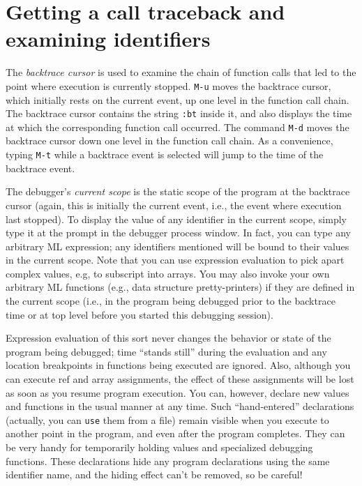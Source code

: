 \section{Getting a call traceback and examining identifiers}

The {\em backtrace cursor} is used to examine the chain of function
calls that led to the point where execution is currently stopped.
\verb'M-u' moves the backtrace cursor, which initially rests on the current
event, up one level in the function call chain.  The
backtrace cursor contains the string \verb':bt' inside it, and also
displays the time at which the corresponding function call occurred.
The command \verb'M-d' moves the backtrace cursor down one level in
the function call chain.  As a convenience, typing \verb'M-t' while a
backtrace event is selected will jump to the time of the backtrace event.

The debugger's {\em current scope} is the static scope of the program
at the backtrace cursor (again, this is initially the current event, i.e.,
the event where execution last stopped).
To display the value of any identifier in the current scope, simply type it
at the prompt in the debugger process window.  In fact, you can type
any arbitrary ML expression; any identifiers mentioned will be bound to
their values in the current scope.  Note that you can use expression 
evaluation to pick apart complex values, e.g, to subscript into arrays.
You may also invoke your own arbitrary ML functions (e.g., data structure
pretty-printers) if they are defined in the current scope (i.e., in the
program being debugged prior to the backtrace time or at top level before
you started this debugging session).

Expression evaluation of this sort never changes the behavior or state
of the program being debugged; time ``stands still'' during the evaluation
and any location breakpoints in functions being executed are ignored.
Also, although you can execute ref and array assignments, the effect of
these assignments will be lost as soon as you resume program execution.
You can, however, declare new values and functions in the usual manner at
any time.
Such ``hand-entered'' declarations (actually, you can \verb'use' them from
a file) remain visible when you 
execute to another point in the program, and even after the program completes.
They can be very handy for temporarily holding values and specialized
debugging functions.
These declarations hide any program declarations 
using the same identifier name, and the hiding effect can't be removed,
so be careful!

